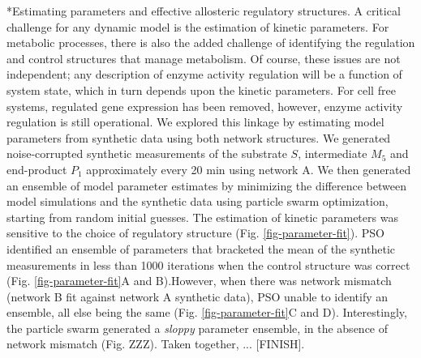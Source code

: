 \documentclass[12pt]{article}
\makeatletter
\renewcommand\subsection{\@startsection
	{subsection}{2}{0mm}
	{-0.05in}
	{-0.5\baselineskip}
	{\normalfont\normalsize\bfseries}}
\makeatother
\begin{document}
\subsection*{Estimating parameters and effective allosteric regulatory structures.}
A critical challenge for any dynamic model is the estimation of kinetic parameters. 
For metabolic processes, there is also the added challenge of identifying the regulation and control structures that manage metabolism.  
Of course, these issues are not independent; any description of enzyme activity regulation will be a function of system state, which
in turn depends upon the kinetic parameters. For cell free systems, regulated gene expression has been removed, however, enzyme activity regulation is still operational. 
We explored this linkage by estimating model parameters from synthetic data using both network
structures. We generated noise-corrupted synthetic measurements of the substrate $S$, intermediate $M_{5}$ and end-product $P_1$ approximately every 20 min using
network A. We then generated an ensemble of model parameter estimates by minimizing the difference between model simulations and the synthetic data using particle swarm
optimization, starting from random initial guesses. The estimation of kinetic parameters was sensitive to the choice of regulatory structure (Fig. \ref{fig-parameter-fit}).
PSO identified an ensemble of parameters that bracketed the mean of the synthetic measurements in less than 1000 iterations when the control structure was correct (Fig. \ref{fig-parameter-fit}A and B).However, when there was network mismatch (network B fit against network A synthetic data), PSO unable to identify an ensemble, all else being the same (Fig. \ref{fig-parameter-fit}C and D). Interestingly, the particle swarm generated a \textit{sloppy} parameter ensemble, in the absence of network mismatch (Fig. ZZZ). 
Taken together, ... [FINISH].
\end{document}
